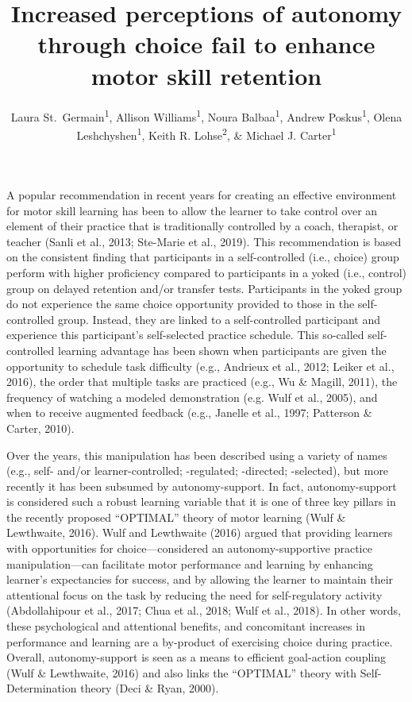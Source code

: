 \documentclass[
  english,
  jou]{apa7}
\title{Increased perceptions of autonomy through choice fail to enhance motor skill retention}
\author{Laura St.~Germain\textsuperscript{1}, Allison Williams\textsuperscript{1}, Noura Balbaa\textsuperscript{1}, Andrew Poskus\textsuperscript{1}, Olena Leshchyshen\textsuperscript{1}, Keith R. Lohse\textsuperscript{2}, \& Michael J. Carter\textsuperscript{1}}
\date{}
\affiliation{\vspace{0.5cm}\textsuperscript{1} Department of Kinesiology, McMaster University\\\textsuperscript{2} Program in Physical Therapy, Washington University School of Medicine in Saint Louis}
\begin{document}
\maketitle

A popular recommendation in recent years for creating an effective environment for motor skill learning has been to allow the learner to take control over an element of their practice that is traditionally controlled by a coach, therapist, or teacher (Sanli et al., 2013; Ste-Marie et al., 2019). This recommendation is based on the consistent finding that participants in a self-controlled (i.e., choice) group perform with higher proficiency compared to participants in a yoked (i.e., control) group on delayed retention and/or transfer tests. Participants in the yoked group do not experience the same choice opportunity provided to those in the self-controlled group. Instead, they are linked to a self-controlled participant and experience this participant's self-selected practice schedule. This so-called self-controlled learning advantage has been shown when participants are given the opportunity to schedule task difficulty (e.g., Andrieux et al., 2012; Leiker et al., 2016), the order that multiple tasks are practiced (e.g., Wu \& Magill, 2011), the frequency of watching a modeled demonstration (e.g. Wulf et al., 2005), and when to receive augmented feedback (e.g., Janelle et al., 1997; Patterson \& Carter, 2010).

Over the years, this manipulation has been described using a variety of names (e.g., self- and/or learner-controlled; -regulated; -directed; -selected), but more recently it has been subsumed by autonomy-support. In fact, autonomy-support is considered such a robust learning variable that it is one of three key pillars in the recently proposed ``OPTIMAL'' theory of motor learning (Wulf \& Lewthwaite, 2016). Wulf and Lewthwaite (2016) argued that providing learners with opportunities for choice---considered an autonomy-supportive practice manipulation---can facilitate motor performance and learning by enhancing learner's expectancies for success, and by allowing the learner to maintain their attentional focus on the task by reducing the need for self-regulatory activity (Abdollahipour et al., 2017; Chua et al., 2018; Wulf et al., 2018). In other words, these psychological and attentional benefits, and concomitant increases in performance and learning are a by-product of exercising choice during practice. Overall, autonomy-support is seen as a means to efficient goal-action coupling (Wulf \& Lewthwaite, 2016) and also links the ``OPTIMAL'' theory with Self-Determination theory (Deci \& Ryan, 2000).
\end{document}
